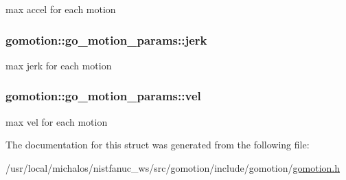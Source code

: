 max accel for each motion 

\hypertarget{structgomotion_1_1go__motion__params_a25db76d9565efdc899bc8bc28b4a7c32}{
\subsubsection[{jerk}]{ gomotion\-::go\-\_\-motion\-\_\-params\-::jerk}}\label{structgomotion_1_1go__motion__params_a25db76d9565efdc899bc8bc28b4a7c32}


max jerk for each motion 

\hypertarget{structgomotion_1_1go__motion__params_ad3121c36c5257557895df5d036b22c9d}{
\subsubsection[{vel}]{ gomotion\-::go\-\_\-motion\-\_\-params\-::vel}}\label{structgomotion_1_1go__motion__params_ad3121c36c5257557895df5d036b22c9d}


max vel for each motion 



The documentation for this struct was generated from the following file\-:\begin{DoxyCompactItemize}
\item 
/usr/local/michalos/nistfanuc\-\_\-ws/src/gomotion/include/gomotion/\hyperlink{gomotion_8h}{gomotion.\-h}\end{DoxyCompactItemize}
